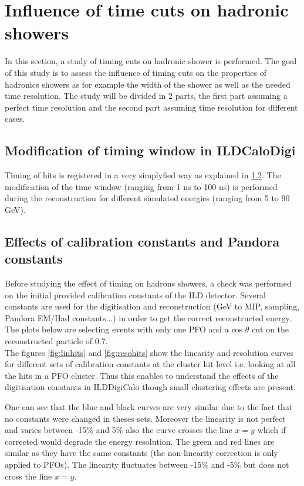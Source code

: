 \section{Influence of time cuts on hadronic showers}

In this section, a study of timing cuts on hadronic shower is performed. The goal of this study is to assess the influence of timing cuts on the properties of hadronics showers as for example the width of the shower as well as the needed time resolution. The study will be divided in 2 parts, the first part assuming a perfect time resolution and the second part assuming time resolution for different cases.

\subsection{Modification of timing window in ILDCaloDigi}

Timing of hits is registered in a very simplyfied way as explained in \ref{}. The modification of the time window (ranging from 1 ns to 100 ns) is performed during the reconstruction for different simulated \kzeroL energies (ranging from 5 to 90 GeV).

\subsection{Effects of calibration constants and Pandora constants}

Before studying the effect of timing on hadrons showers, a check was performed on the initial provided calibration constants of the ILD detector. Several constants are used for the digitisation and reconstruction (GeV to MIP, sampling, Pandora EM/Had constants...) in order to get the correct reconstructed energy. The plots below are selecting events with only one PFO and a cos $\theta$ cut on the reconstructed particle of 0.7.\\

The figures \ref{fig:linhits} and \ref{fig:resohits} show the linearity and resolution curves for different sets of calibration constants at the cluster hit level i.e. looking at all the hits in a PFO cluster. Thus this enables to understand the effects of the digitisation constants in ILDDigiCalo though small clustering effects are present.

One can see that the blue and black curves are very similar due to the fact that no constants were changed in theses sets. Moreover the linearity is not perfect and varies between -15\% and 5\% also the curve crosses the line $x=y$ which if corrected would degrade the energy resolution. The green and red lines are similar as they have the same constants (the non-linearity correction is only applied to PFOs). The linearity fluctuates between -15\% and -5\% but does not cross the line $x=y$.

